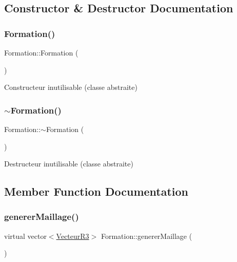 \subsection{Constructor \& Destructor Documentation}
\mbox{\label{class_formation_a60c3058dd353550d89183ec529909cb6}} 
\subsubsection{\texorpdfstring{Formation()}{Formation()}}
{\footnotesize\ttfamily Formation\+::\+Formation (\begin{DoxyParamCaption}{ }\end{DoxyParamCaption})}

Constructeur inutilisable (classe abstraite) \mbox{\label{class_formation_a5b4ffd37549ec211d85e52c916f35eb6}} 
\subsubsection{\texorpdfstring{$\sim$\+Formation()}{~Formation()}}
{\footnotesize\ttfamily Formation\+::$\sim$\+Formation (\begin{DoxyParamCaption}{ }\end{DoxyParamCaption})\hspace{0.3cm}{\ttfamily [virtual]}}

Destructeur inutilisable (classe abstraite) 

\subsection{Member Function Documentation}
\mbox{\label{class_formation_ad1044228c0a1a4ee585ffe7f615c06ea}} 
\subsubsection{\texorpdfstring{generer\+Maillage()}{genererMaillage()}}
{\footnotesize\ttfamily virtual vector$<$\mbox{\hyperlink{class_vecteur_r3}{Vecteur\+R3}}$>$ Formation\+::generer\+Maillage (\begin{DoxyParamCaption}{ }\end{DoxyParamCaption})\hspace{0.3cm}{\ttfamily [pure virtual]}}

